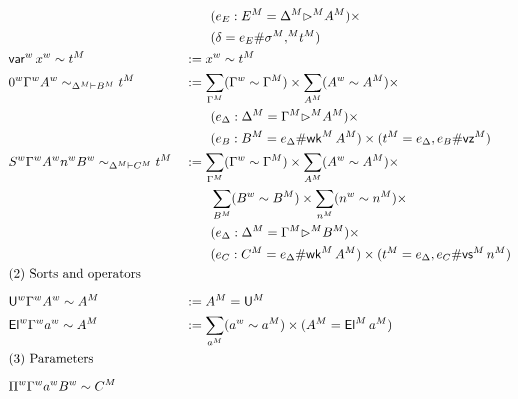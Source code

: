 \begin{alignat*}{5}
    & && \qquad
    (e_E : \model{E} = \model{\Delta} \model{\ext} \model{A}) \times
    \\
    & && \qquad
    (\delta = e_E \# \model\sigma \model{\cons} \model{t} )
    \\
  & \varw\,\wf{x} \sim \model{t}
   && := \wf{x}\sim \model{t} \\
   & \relV{\vzw\wf{\Gamma}\wf{A}}{\model{\Delta}}{\model{B}}{\model{t}}
   && :=
    \sum_{\model{\Gamma}} (\wf{\Gamma}\sim\model{\Gamma}) \times
    \sum_{\model{A}} (\wf{A}\sim\model{A}) \times \\
    & &&
    \qquad
  (e_\Delta : \model{\Delta} = \model{\Gamma} \model{\ext} \model{A})
     \times
    \\
    & && \qquad
     (e_B : \model{B} = e_\Delta \# \model{\wk}\,\model{A}) \times
     (\model{t} = e_\Delta,e_B \# \model{\vz})
  \\
  &
   \relV{\vsw \wf{\Gamma} \wf{A} \wf{n} \wf{B}}{\model\Delta}{\model{C}}{\model{t}}
   && :=
    \sum_{\model{\Gamma}} (\wf{\Gamma}\sim\model{\Gamma}) \times
    \sum_{\model{A}} (\wf{A}\sim\model{A}) \times
    \\
    & &&\qquad
    \sum_{\model{B}} (\wf{B}\sim\model{B}) \times
    \sum_{\model{n}} (\wf{n}\sim\model{n}) \times
    \\
    & &&
    \qquad
  (e_\Delta : \model{\Delta} = \model{\Gamma} \model{\ext} \model{B})
     \times
    \\
    & && \qquad
     (e_C : \model{C} = e_\Delta \# \model{\wk}\,\model{A}) \times
     (\model{t} = e_\Delta,e_C \# \model{\vs} \, \model{n})
  \\
  & \rlap{(2) Sorts and operators} \\[0.5em]
  & \Uw \wf{\Gamma} \wf{A} \sim \model{A} &&
   := \model{A} = \model{\U}
  \\
  & \Elw \wf{\Gamma} \wf{a} \sim \model{A}
  && :=
  \sum_{\model{a}} (\wf{a}\sim  \model{a}) \times
    (\model{A} = \model{\El}\,\model{a})
  \\
  & \rlap{(3) Parameters} \\[0.5em]
  & \Piw \wf{\Gamma} \wf{a} \wf{B} \sim \model{C} &&

\end{alignat*}
